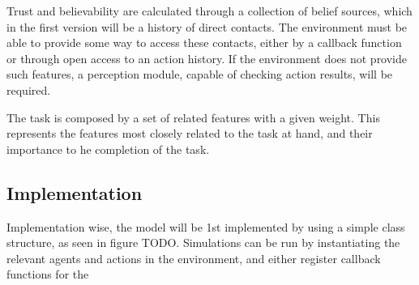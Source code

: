 Trust and believability are calculated through a collection of belief sources, which in the first version will be a history of direct contacts. The environment must be able to provide some way to access these contacts, either by a callback function or through open access to an action history. If the environment does not provide such features, a perception module, capable of checking action results, will be required.

The task is composed by a set of related features with a given weight. This represents the features most closely related to the task at hand, and their importance to he completion of the task.

\subsection{Implementation}

Implementation wise, the model will be 1st implemented by using a simple class structure, as seen in figure TODO. Simulations can be run by instantiating the relevant agents and actions in the environment, and either register callback functions for the 





